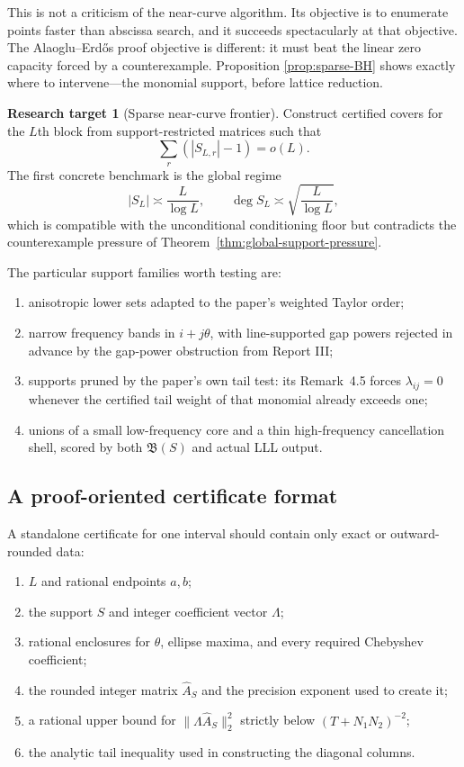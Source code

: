 \documentclass[11pt,oneside]{article}
\theoremstyle{definition}
\newtheorem{target}[theorem]{Research target}
\theoremstyle{remark}
\newcommand{\AEconj}{Alaoglu--Erd\H{o}s}
\newcommand{\tht}{\theta}
\begin{document}
This is not a criticism of the near-curve algorithm.  Its objective is to enumerate points faster
than abscissa search, and it succeeds spectacularly at that objective.  The \AEconj{} proof objective is
different: it must beat the linear zero capacity forced by a counterexample.  Proposition
\ref{prop:sparse-BH} shows exactly where to intervene---the monomial support, before lattice
reduction.

\begin{target}[Sparse near-curve frontier]
\label{target:sparse-BH-frontier}
Construct certified covers for the $L$th block from support-restricted matrices such that
\[
  \sum_r(|S_{L,r}|-1)=o(L).
\]
The first concrete benchmark is the global regime
\[
  |S_L|\asymp\frac{L}{\log L},\qquad
  \deg S_L\asymp\sqrt{\frac{L}{\log L}},
\]
which is compatible with the unconditional conditioning floor but contradicts the counterexample
pressure of Theorem~\ref{thm:global-support-pressure}.
\end{target}

The particular support families worth testing are:
\begin{enumerate}
\item anisotropic lower sets adapted to the paper's weighted Taylor order;
\item narrow frequency bands in $i+j\tht$, with line-supported gap powers rejected in advance by
the gap-power obstruction from Report III;
\item supports pruned by the paper's own tail test: its Remark~4.5 forces $\lambda_{ij}=0$ whenever
the certified tail weight of that monomial already exceeds one;
\item unions of a small low-frequency core and a thin high-frequency cancellation shell, scored by
both $\mathfrak B(S)$ and actual LLL output.
\end{enumerate}

\subsection{A proof-oriented certificate format}

A standalone certificate for one interval should contain only exact or outward-rounded data:

\begin{enumerate}
\item $L$ and rational endpoints $a,b$;
\item the support $S$ and integer coefficient vector $\Lambda$;
\item rational enclosures for $\tht$, ellipse maxima, and every required Chebyshev coefficient;
\item the rounded integer matrix $\widehat A_S$ and the precision exponent used to create it;
\item a rational upper bound for $\|\Lambda\widehat A_S\|_2^2$ strictly below
$(T+N_1N_2)^{-2}$;
\item the analytic tail inequality used in constructing the diagonal columns.
\end{enumerate}
\end{document}
